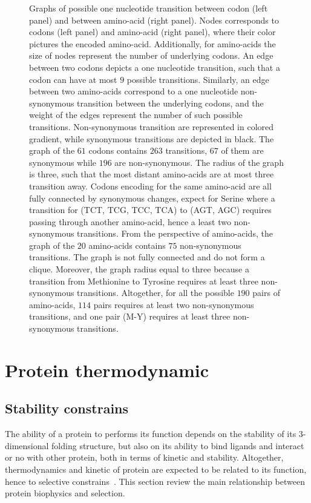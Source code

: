 \begin{figure}[H]
	\caption[Graphs of {codon} and amino-acid transitions]{
		\label{fig:graph-codons-aa}
		Graphs of possible one nucleotide {transition} between \gls{codon} (left panel) and between amino-acid (right panel).
		Nodes corresponds to \glspl{codon} (left panel) and amino-acid (right panel), where their color pictures the encoded amino-acid.
		Additionally, for amino-acids the size of nodes represent the number of underlying \glspl{codon}.
		An edge between two \glspl{codon} depicts a one nucleotide {transition}, such that a \gls{codon} can have at most $9$ possible {transitions}.
		Similarly, an edge between two amino-acids correspond to a one nucleotide non-synonymous {transition} between the underlying \glspl{codon}, and the weight of the edges represent the number of such possible {transitions}.
		Non-synonymous {transition} are represented in colored gradient, while synonymous {transitions} are depicted in black.
		The graph of the $61$ \glspl{codon} contains $263$ {transitions}, $67$ of them are synonymous while $196$ are non-synonymous.
		The radius of the graph is three, such that the most distant amino-acids are at most three {transition} away.
		Codons encoding for the same amino-acid are all fully connected by synonymous changes, expect for Serine where a {transition} for (TCT, TCG, TCC,	TCA) to (AGT, AGC) requires passing through another amino-acid, hence a least two non-synonymous {transitions}.
		From the perspective of amino-acids, the graph of the $20$ amino-acids contains $75$ non-synonymous {transitions}.
		The graph is not fully connected and do not form a clique. Moreover, the graph radius equal to three because a {transition} from Methionine to Tyrosine requires at least three non-synonymous {transitions}.
		Altogether, for all the possible $190$ pairs of amino-acids, $114$ pairs requires at least two non-synonymous {transitions}, and one pair (M-Y) requires at least three non-synonymous {transitions}.
	}
\end{figure}

\section{Protein thermodynamic}
\label{sec-intro:physic-protein}

\subsection{Stability constrains}

The ability of a protein to performs its function depends on the stability of its 3-dimensional folding structure, but also on its ability to bind ligands and interact or no with other protein, both in terms of kinetic and stability.
Altogether, thermodynamics and kinetic of protein are expected to be related to its function, hence to selective constrains~\citep{Bastolla2017}.
This section review the main relationship between protein biophysics and selection.

